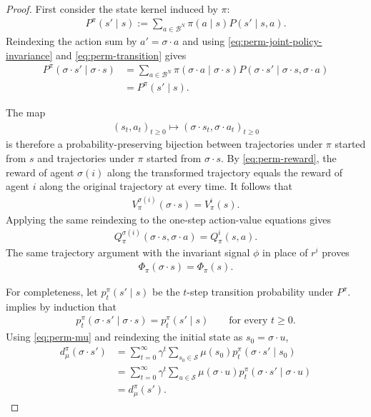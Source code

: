 \documentclass{article}
\theoremstyle{plain}
\theoremstyle{definition}
\theoremstyle{remark}
\newcommand{\St}{\mathcal{S}}
\begin{document}
\begin{proof}
First consider the state kernel induced by $\pi$:
\begin{align*}
  P^\pi(s'\mid s)
  :=
  \sum_{a\in\mathcal B^N}\pi(a\mid s)P(s'\mid s,a).
\end{align*}
Reindexing the action sum by $a'\!=\sigma\mathbin{\cdot}a$ and using
\eqref{eq:perm-joint-policy-invariance} and \eqref{eq:perm-transition} gives
\begin{align}
  P^\pi(\sigma\mathbin{\cdot}s'\mid\sigma\mathbin{\cdot}s)
  &=
  \sum_{a\in\mathcal B^N}
  \pi(\sigma\mathbin{\cdot}a\mid\sigma\mathbin{\cdot}s)
  P(\sigma\mathbin{\cdot}s'\mid
    \sigma\mathbin{\cdot}s,\sigma\mathbin{\cdot}a)
  \nonumber\\
  &=
  P^\pi(s'\mid s).
  \label{eq:perm-policy-kernel}
\end{align}

The map
\begin{align*}
  (s_t,a_t)_{t\ge0}
  \longmapsto
  (\sigma\mathbin{\cdot}s_t,\sigma\mathbin{\cdot}a_t)_{t\ge0}
\end{align*}
is therefore a probability-preserving bijection between trajectories under
$\pi$ started from $s$ and trajectories under $\pi$ started from
$\sigma\mathbin{\cdot}s$. By \eqref{eq:perm-reward}, the reward of agent
$\sigma(i)$ along the transformed trajectory equals the reward of agent $i$
along the original trajectory at every time. It follows that
\begin{align*}
  V^{\sigma(i)}_\pi(\sigma\mathbin{\cdot}s)
  =
  V^i_\pi(s).
\end{align*}
Applying the same reindexing to the one-step action-value equations gives
\begin{align*}
  Q^{\sigma(i)}_\pi(
    \sigma\mathbin{\cdot}s,\sigma\mathbin{\cdot}a)
  =
  Q^i_\pi(s,a).
\end{align*}
The same trajectory argument with the invariant signal $\phi$ in place of
$r^i$ proves
\begin{align*}
  \Phi_\pi(\sigma\mathbin{\cdot}s)
  =
  \Phi_\pi(s).
\end{align*}

For completeness, let $p_t^\pi(s'\mid s)$ be the $t$-step transition
probability under $P^\pi$.  implies by
induction that
\begin{align*}
  p_t^\pi(
    \sigma\mathbin{\cdot}s'\mid\sigma\mathbin{\cdot}s)
  =
  p_t^\pi(s'\mid s)
  \qquad
  \text{for every $t\ge0$.}
\end{align*}
Using \eqref{eq:perm-mu} and reindexing the initial state as
$s_0=\sigma\mathbin{\cdot}u$,
\begin{align*}
  d^\pi_\mu(\sigma\mathbin{\cdot}s')
  &=
  \sum_{t=0}^{\infty}\gamma^t
  \sum_{s_0\in\St}
  \mu(s_0)
  p_t^\pi(\sigma\mathbin{\cdot}s'\mid s_0)\\
  &=
  \sum_{t=0}^{\infty}\gamma^t
  \sum_{u\in\St}
  \mu(\sigma\mathbin{\cdot}u)
  p_t^\pi(
    \sigma\mathbin{\cdot}s'\mid\sigma\mathbin{\cdot}u)\\
  &=
  d^\pi_\mu(s').
\end{align*}


\end{proof}
\end{document}
